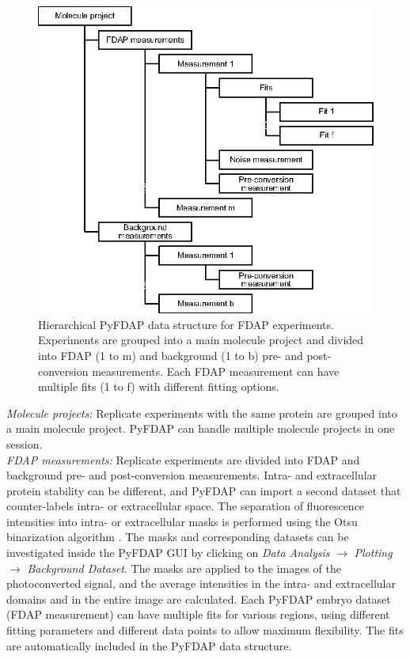 \documentclass[a4paper,11pt]{article}
\begin{document}
\begin{figure} [H]
 \centering
 \includegraphics[scale=1.0]{figs/Blaessle_Figure1.eps}
\caption{Hierarchical PyFDAP data structure for FDAP experiments. Experiments are grouped into a main molecule project and divided into FDAP (1 to m) and background (1 to b) pre- and post-conversion measurements. Each FDAP measurement can have multiple fits (1 to f) with different fitting options.}
\label{fig:structure}
 \end{figure}

\noindent \textit{Molecule projects:} Replicate experiments with the same protein are grouped into a main molecule project. PyFDAP can handle multiple molecule projects in one session.  \\

\noindent \textit{FDAP measurements:} Replicate experiments are divided into FDAP and background pre- and post-conversion measurements. Intra- and extracellular protein stability can be different, and PyFDAP can import a second dataset that counter-labels intra- or extracellular space. The separation of fluorescence intensities into intra- or extracellular masks is performed using the Otsu binarization algorithm \citep{Otsu1979}. The masks and corresponding datasets can be investigated inside the PyFDAP GUI by clicking on \textit{Data Analysis} $\rightarrow$ \textit{Plotting} $\rightarrow$ \textit{Background Dataset}. The masks are applied to the images of the photoconverted signal, and the average intensities in the intra- and extracellular domains and in the entire image are calculated. Each PyFDAP embryo dataset (FDAP measurement) can have multiple fits for various regions, using different fitting parameters and different data points to allow maximum flexibility. The fits are automatically included in the PyFDAP data structure. \\
\end{document}
